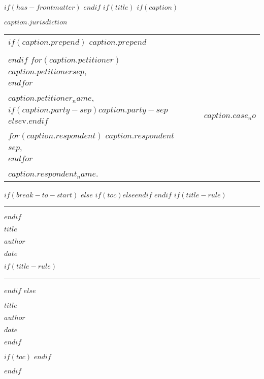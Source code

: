 $if(has-frontmatter)$
\frontmatter
$endif$
$if(title)$
\thispagestyle{empty}
$if(caption)$
\begin{center}\bfseries
    $caption.jurisdiction$
\end{center}

\vspace{1em}

\setlength{\tabcolsep}{0em}
\setlength{\parindent}{0em}
\begin{tabular}{p{} p{} | p{} p{}}
    \vspace{0.5em}
    $if(caption.prepend)$
    $caption.prepend$ &&& \\ &&& \\
    $endif$
    $for(caption.petitioner)$
    $caption.petitioner$$sep$, &&& \\
    $endfor$ &&& \\ &&& \\
    \hspace{5em}\textit{$caption.petitioner_name$}, & & & \\
    \vspace{0.5em}
    \hspace{2em}$if(caption.party-sep)$$caption.party-sep$$else$v.$endif$ & & &
    \vspace{0.5em} $caption.case_no$ \\
    \vspace{1em}
    $for(caption.respondent)$
    $caption.respondent$$sep$, &&& \\
    $endfor$ &&& \\ &&& \\
    \hspace{5em}\textit{$caption.respondent_name$}.
    & & &
    \vspace*{1em} \\
    \cline{1-2}
\end{tabular}
\setlength{\parindent}{0.5in}

\vspace{2em}

$if(break-to-start)$
\vspace{2em}
$else$
$if(toc)$\vspace{2em}$else$\vspace{0.5em}$endif$
$endif$
$if(title-rule)$
\hrule
$endif$
\begin{center}\bfseries
    \MakeUppercase{$title$}

    $author$

    $date$
\end{center}
$if(title-rule)$
\hrule
$endif$
$else$
\vspace*{2in}
\begin{center}\bfseries
    $title$

    $author$

    \vspace{1em}

    $date$
\end{center}
$endif$

$if(toc)$
\clearpage
$endif$

$endif$

